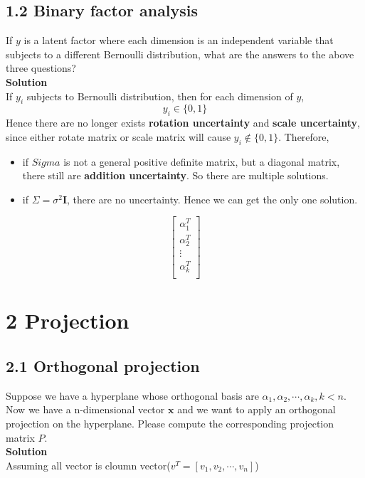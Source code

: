 \documentclass[20pt]{article}
\newcommand{\solution}{\textbf{\normalsize Solution}}
\newcommand{\I}{\mathbf{I}}
\newcommand{\x}{\mathbf{x}}
\begin{document}
 \subsection*{1.2 Binary factor analysis}
 {\color{blue} If $y$ is a latent factor where each dimension is an independent variable that subjects to a different Bernoulli distribution, what are the answers to the above three questions?\
 } \\
 \solution \\
 If $y_i$ subjects to Bernoulli distribution, then for each dimension of $y$,
 $$y_i \in \{0, 1\}$$
 Hence there are no longer exists \textbf{rotation uncertainty} and \textbf{scale uncertainty}, since either rotate matrix or scale matrix will cause $y_i\notin \{0, 1\}$.
 Therefore,
 \begin{itemize}
     \item if $Sigma$ is not a general positive definite matrix, but a diagonal matrix, there still are \textbf{addition uncertainty}. So there are multiple solutions.
     \item if $\Sigma = \sigma^2\I$, there are no uncertainty. Hence we can get the only one solution.
 \end{itemize}


 $$\begin{bmatrix}
                    \alpha_1^T \\
                    \alpha_2^T \\
                    \vdots \\
                    \alpha_k^T \\
                \end{bmatrix}$$
\section*{2 Projection}
 \subsection*{2.1 Orthogonal projection}
 {\color{blue} Suppose we have a hyperplane whose orthogonal basis are $\alpha_1, \alpha_2, \cdots , \alpha_k, k < n$. Now we have a n-dimensional vector $\x$ and we want to apply an orthogonal projection on the hyperplane. Please compute the corresponding projection matrix $P$.
 } \\
 \solution \\
 Assuming all vector is cloumn vector($v^T = [v_1, v_2, \cdots, v_n]$)\\
\end{document}

